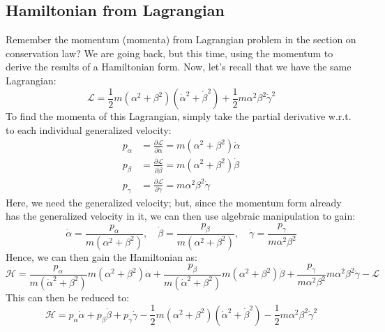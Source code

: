 \subsection{Hamiltonian from Lagrangian}
Remember the momentum (momenta) from Lagrangian problem in the section on conservation law? We are going back, but this time, using the momentum to derive the results of a Hamiltonian form. Now, let's recall that we have the same Lagrangian: 
\begin{equation}
    \mathcal{L} = \frac{1}{2}m (\alpha^{2}+ \beta^{2}) (\dot{\alpha}^{2} + \dot{\beta}^{2})+ \frac{1}{2}m\alpha^{2}\beta^{2}\dot{\gamma}^{2}
\end{equation}
To find the momenta of this Lagrangian, simply take the partial derivative w.r.t. to each individual generalized velocity: 
\begin{align*}
    p_{\alpha} & = \frac{\partial \mathcal{L}}{\partial \dot{\alpha}} = m(\alpha^{2}+\beta^{2}) \dot{\alpha}\\
    p_{\beta} & = \frac{\partial \mathcal{L}}{\partial \dot{\beta}} = m(\alpha^{2}+\beta^{2}) \dot{\beta}\\
    p_{\gamma} & =  \frac{\partial \mathcal{L}}{\partial \dot{\gamma}} = m\alpha^{2}\beta^{2}\dot{\gamma} 
\end{align*}
Here, we need the generalized velocity; but, since the momentum form already has the generalized velocity in it, we can then use algebraic manipulation to gain: 
\begin{equation}
    \dot{\alpha} = \frac{p_{\alpha}}{m(\alpha^{2}+ \beta^{2})}, \quad 
    \dot{\beta} = \frac{p_{\beta}}{m(\alpha^{2}+ \beta^{2})}, \quad 
    \dot{\gamma} = \frac{p_{\gamma}}{m\alpha^{2}\beta^{2}}
\end{equation}
Hence, we can then gain the Hamiltonian as: 
\begin{equation}
    \mathcal{H} = \frac{p_{\alpha}}{m(\dot{\alpha}^{2}+ \beta^{2})} m(\alpha^{2}+\beta^{2}) \dot{\alpha} + \frac{p_{\beta}}{m(\dot{\alpha}^{2}+ \beta^{2})}m(\alpha^{2}+\beta^{2}) \dot{\beta} + \frac{p_{\gamma}}{m\alpha^{2}\beta^{2}}m\alpha^{2}\beta^{2}\dot{\gamma} - \mathcal{L}
\end{equation}
This can then be reduced to: 
\begin{equation}
    \mathcal{H} = p_{\alpha} \dot{\alpha} + p_{\beta}\dot{\beta} + p_{\gamma}\dot{\gamma} - \frac{1}{2}m (\alpha^{2}+ \beta^{2}) (\dot{\alpha}^{2} + \dot{\beta}^{2})- \frac{1}{2}m\alpha^{2}\beta^{2}\dot{\gamma}^{2}
\end{equation}
